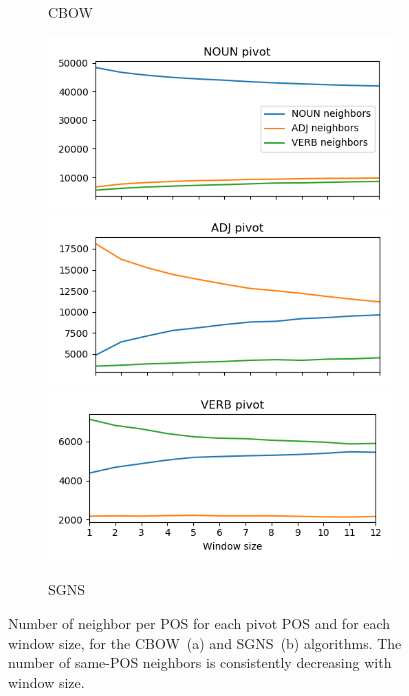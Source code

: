 \documentclass[11pt,a4paper]{article}
\begin{document}
\begin{figure}[t]
\begin{subfigure}[b]{\columnwidth}
        \caption{CBOW}
        \end{subfigure}
        \begin{subfigure}[b]{\columnwidth}
        \includegraphics[width=\columnwidth]{figs/NOUN_nn_100_fasttext_enwiki-20170501-clean_skipgram-300d-min500_pos.png}
        \includegraphics[width=\columnwidth]{figs/ADJ_nn_100_fasttext_enwiki-20170501-clean_skipgram-300d-min500_pos.png}
        \includegraphics[width=\columnwidth]{figs/VERB_nn_100_fasttext_enwiki-20170501-clean_skipgram-300d-min500_pos.png}
        \caption{SGNS}
        \end{subfigure}
        \caption{Number of neighbor per POS for each pivot POS and for each window size,
        for the CBOW~(a) and SGNS~(b) algorithms.
        The number of same-POS neighbors is consistently decreasing with window size.
        \label{fig:nn_pos_hist}}
    \end{figure}
    
\end{document}
